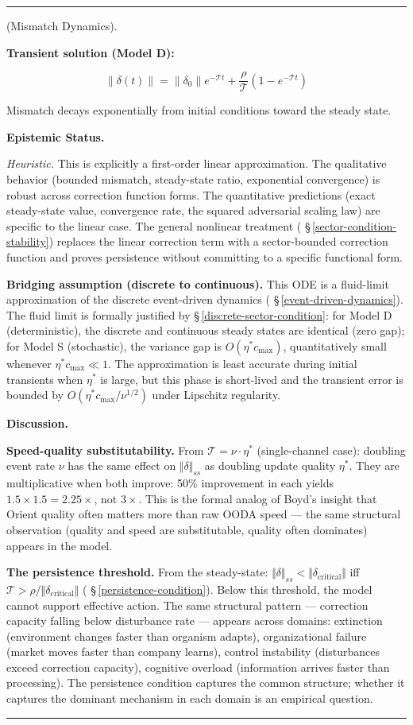 \documentclass[11pt,oneside]{article}
\newcounter{claim}[section]
\renewcommand{\theclaim}{\thesection.\arabic{claim}}
\newenvironment{segment}[2]{%
  \refstepcounter{claim}%
  \bigskip\noindent\hrule\smallskip
  \noindent{\bfseries #1~\theclaim}\enskip(#2).\par\smallskip
  \noindent\ignorespaces
}{%
  \par\smallskip\noindent\hrule\bigskip
}
\newenvironment{hypothesis}[1][]{\begin{segment}{Hypothesis}{#1}}{\end{segment}}
\begin{document}
\begin{hypothesis}[Mismatch Dynamics]
\textbf{Transient solution (Model D):}

$$\lVert\delta(t)\rVert = \lVert\delta_0\rVert e^{-\mathcal{T} t} + \frac{\rho}{\mathcal{T}}(1 - e^{-\mathcal{T} t})$$

Mismatch decays exponentially from initial conditions toward the steady state.


\medskip\noindent\textbf{Epistemic Status.}


\textit{Heuristic.} This is explicitly a first-order linear approximation. The qualitative behavior (bounded mismatch, steady-state ratio, exponential convergence) is robust across correction function forms. The quantitative predictions (exact steady-state value, convergence rate, the squared adversarial scaling law) are specific to the linear case. The general nonlinear treatment ( \S\,\ref{sector-condition-stability}) replaces the linear correction term with a sector-bounded correction function and proves persistence without committing to a specific functional form.

\textbf{Bridging assumption (discrete to continuous).} This ODE is a fluid-limit approximation of the discrete event-driven dynamics ( \S\,\ref{event-driven-dynamics}). The fluid limit is formally justified by \S\,\ref{discrete-sector-condition}: for Model D (deterministic), the discrete and continuous steady states are identical (zero gap); for Model S (stochastic), the variance gap is $O(\eta^* c_{\max})$, quantitatively small whenever $\eta^* c_{\max} \ll 1$. The approximation is least accurate during initial transients when $\eta^*$ is large, but this phase is short-lived and the transient error is bounded by $O(\eta^* c_{\max} / \nu^{1/2})$ under Lipschitz regularity.


\medskip\noindent\textbf{Discussion.}


\textbf{Speed-quality substitutability.} From $\mathcal{T} = \nu \cdot \eta^*$ (single-channel case): doubling event rate $\nu$ has the same effect on $\Vert\delta\Vert_{ss}$ as doubling update quality $\eta^*$. They are multiplicative when both improve: 50\% improvement in each yields $1.5 \times 1.5 = 2.25\times$, not $3\times$. This is the formal analog of Boyd's insight that Orient quality often matters more than raw OODA speed — the same structural observation (quality and speed are substitutable, quality often dominates) appears in the model.

\textbf{The persistence threshold.} From the steady-state: $\Vert\delta\Vert_{ss} < \Vert\delta_{\text{critical}}\Vert$ iff $\mathcal{T} > \rho/\Vert\delta_{\text{critical}}\Vert$ ( \S\,\ref{persistence-condition}). Below this threshold, the model cannot support effective action. The same structural pattern — correction capacity falling below disturbance rate — appears across domains: extinction (environment changes faster than organism adapts), organizational failure (market moves faster than company learns), control instability (disturbances exceed correction capacity), cognitive overload (information arrives faster than processing). The persistence condition captures the common structure; whether it captures the dominant mechanism in each domain is an empirical question.


\end{hypothesis}
\end{document}
